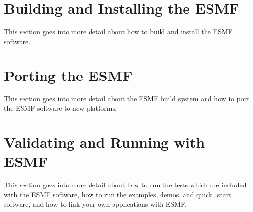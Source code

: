 
\setlength{\parskip}{1.5ex}
\setlength{\parindent}{0em}


\section{Building and Installing the ESMF}
\label{sec:TechOver}

This section goes into more detail about how to build and install the ESMF
software.




\section{Porting the ESMF}
\label{sec:TechOverPort}

This section goes into more detail about the ESMF build system and how to
port the ESMF software to new platforms.




\section{Validating and Running with ESMF}
\label{sec:TechOver2}

This section goes into more detail about how to run the tests which are
included with the ESMF software, how to run the examples, demos, and
quick\_start software, and how to link your own applications with ESMF.




%
